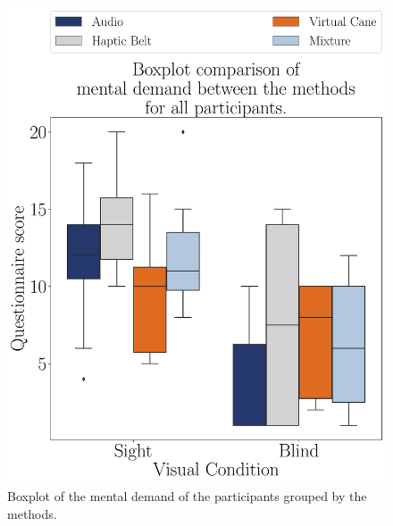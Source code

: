 \begin{figure}[!htb]
    \centering
    \begin{minipage}{0.45\textwidth}
        \centering
        \includegraphics[width = \textwidth]{Resultados/Nasa/Figuras/pdf/boxplot_noBase_md_4_scene.pdf}
        \caption{Boxplot of the mental demand of the participants grouped by the methods.}
        \label{fig:boxplot_noBase_md_4_scene}
    \end{minipage}
    \begin{minipage}{0.075\textwidth}
        \hfill
    \end{minipage}
    \begin{minipage}{0.45\textwidth}
        \centering

\end{minipage}
\end{figure}
